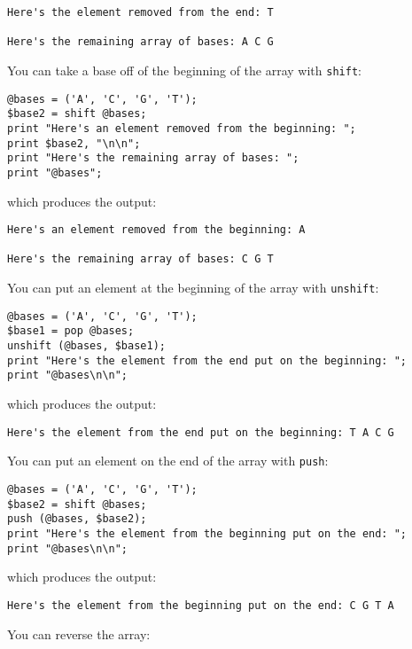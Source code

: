\begin{lstlisting}
Here's the element removed from the end: T

Here's the remaining array of bases: A C G
\end{lstlisting}

You can take a base off of the beginning of the array with \verb|shift|:

\begin{lstlisting}
@bases = ('A', 'C', 'G', 'T');
$base2 = shift @bases;
print "Here's an element removed from the beginning: ";
print $base2, "\n\n";
print "Here's the remaining array of bases: ";
print "@bases";
\end{lstlisting}

which produces the output:

\begin{lstlisting}
Here's an element removed from the beginning: A

Here's the remaining array of bases: C G T
\end{lstlisting}

You can put an element at the beginning of the array with \verb|unshift|: 

\begin{lstlisting}
@bases = ('A', 'C', 'G', 'T');
$base1 = pop @bases;
unshift (@bases, $base1);
print "Here's the element from the end put on the beginning: ";
print "@bases\n\n";
\end{lstlisting}

which produces the output:

\begin{lstlisting}
Here's the element from the end put on the beginning: T A C G
\end{lstlisting}

You can put an element on the end of the array with \verb|push|: 

\begin{lstlisting}
@bases = ('A', 'C', 'G', 'T');
$base2 = shift @bases;
push (@bases, $base2);
print "Here's the element from the beginning put on the end: ";
print "@bases\n\n";
\end{lstlisting}

which produces the output:

\begin{lstlisting}
Here's the element from the beginning put on the end: C G T A
\end{lstlisting}

You can reverse the array: 

